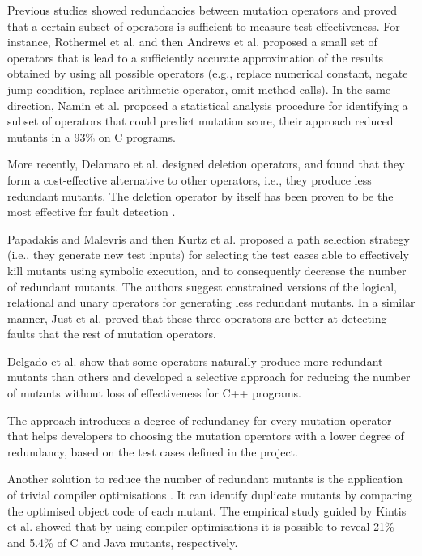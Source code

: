Previous studies showed redundancies between mutation operators and proved that a certain subset of operators is sufficient to measure test effectiveness. For instance, Rothermel et al. \cite{rothermel1996experimental} and then Andrews et al. \cite{andrews2005mutation} proposed a small set of operators that is lead to a sufficiently accurate approximation of the results obtained by using all possible operators (e.g., replace numerical constant, negate jump condition, replace arithmetic operator, omit method calls). In the same direction, Namin et al. \cite{siami2008sufficient} proposed a statistical analysis procedure for identifying a subset of operators that could predict mutation score, their approach reduced mutants in a 93\% on C programs. 

More recently, Delamaro et al. \cite{delamaro2014designing} designed deletion operators, and found that they form a cost-effective alternative to other operators, i.e., they produce less redundant mutants. The deletion operator by itself has been proven to be the most effective for fault detection \cite{delamaro2014designing}.

Papadakis and Malevris \cite{papadakis2012mutation} and then Kurtz et al. \cite{kurtz2015static} proposed a path selection strategy (i.e., they generate new test inputs) for selecting the test cases able to effectively kill mutants using symbolic execution, and to consequently decrease the number of redundant mutants. 
The authors suggest constrained versions of the logical, relational and unary operators for generating less redundant mutants. 
In a similar manner, Just et al. \cite{just2012redundant,just2015higher} proved that these three operators are better at detecting faults that the rest of mutation operators.

Delgado et al. \cite{delgado2017assessment} show that some operators naturally produce more redundant mutants than others and
developed a selective approach for reducing the number of mutants without loss of effectiveness for C++ programs. 

The approach introduces a degree of redundancy for every mutation operator that helps developers to choosing the mutation operators with a lower degree of redundancy, based on the test cases defined in the project.

Another solution to reduce the number of redundant mutants is the application of trivial compiler optimisations \cite{papadakis2015trivial, kintis2017detecting,papadakis2019mutation}. 
It can identify duplicate mutants by comparing the optimised object code of each mutant. The empirical study guided by Kintis et al. \cite{kintis2017detecting} showed that by using compiler optimisations it is possible to reveal 21\% and 5.4\% of C and Java mutants, respectively.


